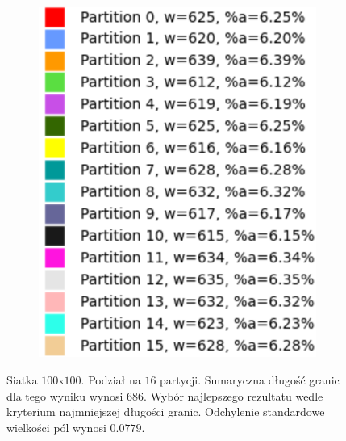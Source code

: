 \begin{figure}[h]
\centering
\begin{subfigure}{.5\textwidth}
    \centering
    \caption[short]{}
\end{subfigure}%
\begin{subfigure}{.5\textwidth}
    \centering
    \includegraphics[width=0.6\linewidth]{images/results/m_k/without/1/results}
    \caption[short]{}
\end{subfigure}
\caption{Siatka $100$x$100$. Podział na $16$ partycji. Sumaryczna długość granic dla tego wyniku wynosi $686$.
Wybór najlepszego rezultatu wedle kryterium najmniejszej długości granic. Odchylenie standardowe wielkości pól wynosi
$0.0779$.}

\label{result:w1}
\end{figure}
